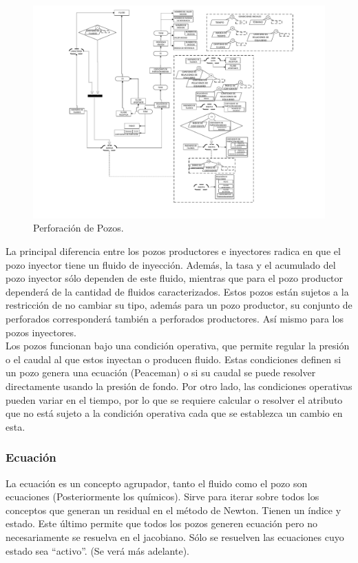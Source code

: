 \begin{figure}[h]
	\centering%
	\includegraphics[width=0.9\linewidth]{Kap4/Equilibrium.pdf}%
	\caption{Perforación de Pozos.} \label{fig:Well}
\end{figure}

La principal diferencia entre los pozos productores e inyectores radica en que el pozo inyector tiene un fluido de inyección. Además, la tasa y el acumulado del pozo inyector sólo dependen de este fluido, mientras que para el pozo productor dependerá de la cantidad de fluidos caracterizados. Estos pozos están sujetos a la restricción de no cambiar su tipo, además para un pozo productor, su conjunto de perforados corresponderá también a perforados productores. Así mismo para los pozos inyectores.\\

Los pozos funcionan bajo una condición operativa, que permite regular la presión o el caudal al que estos inyectan o producen fluido. Estas condiciones definen si un pozo genera una ecuación (Peaceman) o si su caudal se puede resolver directamente usando la presión de fondo. Por otro lado, las condiciones operativas pueden variar en el tiempo, por lo que se requiere calcular o resolver el atributo que no está sujeto a la condición operativa cada que se establezca un cambio en esta. 

\subsubsection{Ecuación}\label{sec:PS_Equation}
 La ecuación es un concepto agrupador, tanto el fluido como el pozo son ecuaciones (Posteriormente los químicos). Sirve para iterar sobre todos los conceptos que generan un residual en el método de Newton. Tienen un índice y estado. Este último permite que todos los pozos generen ecuación pero no necesariamente se resuelva en el jacobiano. Sólo se resuelven las ecuaciones cuyo estado sea ``activo''. (Se verá más adelante).
 

